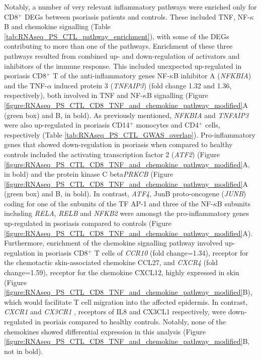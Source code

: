 Notably, a number of very relevant inflammatory pathways were enriched only for CD8$^+$ DEGs between psoriasis patients and controls. These included TNF, NF-$\kappa$B and chemokine signalling (Table \ref{tab:RNAseq_PS_CTL_pathway_enrichment}), with some of the DEGs contributing to more than one of the pathways. Enrichment of these three pathways resulted from combined up- and down-regulation of activators and inhibitors of the immune response. This included unexpected up-regulated in psoriasis CD8$^+$ T of the anti-inflammatory genes NF-$\kappa$B inhibitor A (\textit{NFKBIA}) and the TNF-$\alpha$ induced protein 3 (\textit{TNFAIP3}) (fold change 1.32 and 1.36, respectively), both involved in TNF and NF-$\kappa$B signalling (Figure \ref{figure:RNAseq_PS_CTL_CD8_TNF_and_chemokine_pathway_modified}A (green box) and B, in bold).  As previously mentioned, \textit{NFKBIA} and \textit{TNFAIP3} were also up-regulated in psoriasis CD14$^+$ monocytes and CD4$^+$ cells, respectively (Table \ref{tab:RNAseq_PS_CTL_GWAS_overlap}). Pro-inflammatory genes that showed down-regulation in psoriasis when compared to healthy controls included the activating transcription factor 2 (\textit{ATF2}) (Figure \ref{figure:RNAseq_PS_CTL_CD8_TNF_and_chemokine_pathway_modified}A, in bold) and the protein kinase C beta\textit{PRKCB} (Figure \ref{figure:RNAseq_PS_CTL_CD8_TNF_and_chemokine_pathway_modified}A (green box) and B, in bold). In contrast, \textit{ATF4}, JunB proto-oncogene (\textit{JUNB}) coding for one of the subunits of the TF AP-1 and three of the NF-$\kappa$B subunits including \textit{RELA}, \textit{RELB} and \textit{NFKB2} were amonsgt the pro-inflammatory genes up-regulated in psoriasis compared to controls (Figure \ref{figure:RNAseq_PS_CTL_CD8_TNF_and_chemokine_pathway_modified}A). Furthermore, enrichment of the chemokine signalling pathway involved up-regulation in psoriasis CD8$^+$ T cells of \textit{CCR10} (fold change=1.34), receptor for the chemotactic skin-associated chemokine CCL27, and \textit{CXCR4} (fold change=1.59), receptor for the chemokine CXCL12, highly expressed in skin \parencite{Zgraggen2014} (Figure \ref{figure:RNAseq_PS_CTL_CD8_TNF_and_chemokine_pathway_modified}B), which would facilitate T cell migration into the affected epidermis. In contrast,  \textit{CXCR1} and \textit{CX3CR1} , receptors of IL8 and CX3CL1 respectively, were down-regulated in psoriais compared to healthy controls. Notably, none of the chemokines showed differential expression in this analysis (Figure \ref{figure:RNAseq_PS_CTL_CD8_TNF_and_chemokine_pathway_modified}B, not in bold). 
	
